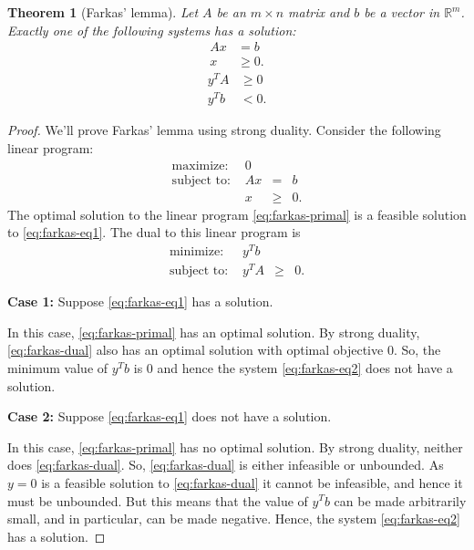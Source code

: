 \documentclass[
]{book}
\newtheorem{theorem}{Theorem}[chapter]
\theoremstyle{definition}
\theoremstyle{definition}
\theoremstyle{definition}
\theoremstyle{definition}
\theoremstyle{remark}
\begin{document}
\begin{theorem}[Farkas' lemma]
\protect\hypertarget{thm:farkas-lemma}{}\label{thm:farkas-lemma}Let \(A\) be an \(m \times n\) matrix and \(b\) be a vector in \(\mathbb{R}^m\).
Exactly one of the following systems has a solution:
\begin{align}
  A x & = b \\ 
  x & \ge 0.
\label{eq:farkas-eq1}
\end{align}
\begin{align}
  y^T A & \ge 0 \\ 
  y^T b & < 0.
\label{eq:farkas-eq2}
\end{align}

\end{theorem}

\begin{proof}
We'll prove Farkas' lemma using strong duality. Consider the following linear program:
\begin{equation}
  \begin{array}{llll}
    \mbox{maximize: } & 0 \\
    \mbox{subject to: } 
      & A x & = & b \\ 
      & x & \ge & 0.
  \end{array}
\label{eq:farkas-primal}
\end{equation}
The optimal solution to the linear program \eqref{eq:farkas-primal} is a feasible solution to \eqref{eq:farkas-eq1}. The dual to this linear program is
\begin{equation}
  \begin{array}{llll}
    \mbox{minimize: } & y^T b \\
    \mbox{subject to: } 
      & y^T A & \ge & 0.
  \end{array}
\label{eq:farkas-dual}
\end{equation}

\textbf{Case 1:} Suppose \eqref{eq:farkas-eq1} has a solution.

In this case, \eqref{eq:farkas-primal} has an optimal solution. By strong duality, \eqref{eq:farkas-dual} also has an optimal solution with optimal objective \(0\). So, the minimum value of \(y^T b\) is \(0\) and hence the system \eqref{eq:farkas-eq2} does not have a solution.

\textbf{Case 2:} Suppose \eqref{eq:farkas-eq1} does not have a solution.

In this case, \eqref{eq:farkas-primal} has no optimal solution. By strong duality, neither does \eqref{eq:farkas-dual}. So, \eqref{eq:farkas-dual} is either infeasible or unbounded. As \(y = 0\) is a feasible solution to \eqref{eq:farkas-dual} it cannot be infeasible, and hence it must be unbounded. But this means that the value of \(y^T b\) can be made arbitrarily small, and in particular, can be made negative. Hence, the system \eqref{eq:farkas-eq2} has a solution.
\end{proof}
\end{document}
